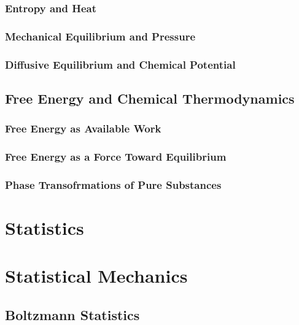 \documentclass[a4paper]{article}
\begin{document}
\subsubsection{Entropy and Heat}
\subsubsection{Mechanical Equilibrium and Pressure}
\subsubsection{Diffusive Equilibrium and Chemical Potential}

\subsection{Free Energy and Chemical Thermodynamics}
\subsubsection{Free Energy as Available Work}
\subsubsection{Free Energy as a Force Toward Equilibrium}
\subsubsection{Phase Transofrmations of Pure Substances}

\section{Statistics}


\section{Statistical Mechanics}

\subsection{Boltzmann Statistics}
\end{document}
